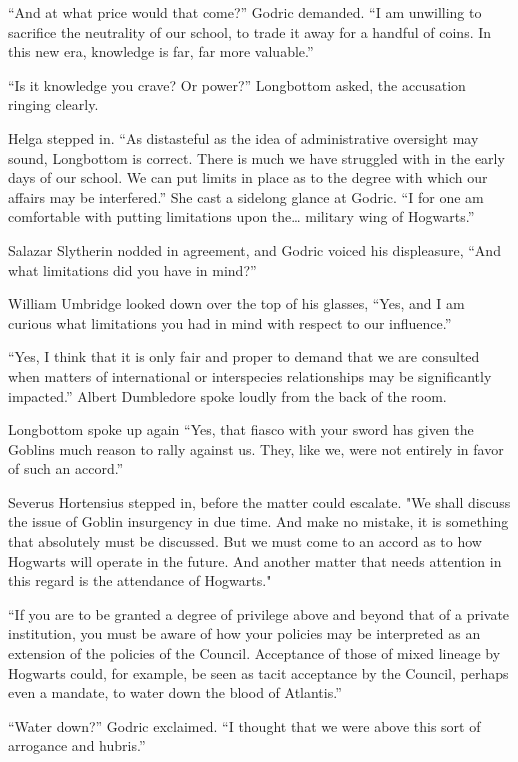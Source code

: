 “And at what price would that come?” Godric demanded. “I am unwilling to sacrifice the neutrality of our school, to trade it away for a handful of coins. In this new era, knowledge is far, far more valuable.”

“Is it knowledge you crave? Or power?” Longbottom asked, the accusation ringing clearly.

Helga stepped in. “As distasteful as the idea of administrative oversight may sound, Longbottom is correct. There is much we have struggled with in the early days of our school. We can put limits in place as to the degree with which our affairs may be interfered.” She cast a sidelong glance at Godric. “I for one am comfortable with putting limitations upon the… military wing of Hogwarts.”

Salazar Slytherin nodded in agreement, and Godric voiced his displeasure, “And what limitations did you have in mind?”

William Umbridge looked down over the top of his glasses, “Yes, and I am curious what limitations you had in mind with respect to our influence.”

“Yes, I think that it is only fair and proper to demand that we are consulted when matters of international or interspecies relationships may be significantly impacted.” Albert Dumbledore spoke loudly from the back of the room.

Longbottom spoke up again “Yes, that fiasco with your sword has given the Goblins much reason to rally against us. They, like we, were not entirely in favor of such an accord.”

Severus Hortensius stepped in, before the matter could escalate. "We shall discuss the issue of Goblin insurgency in due time. And make no mistake, it is something that absolutely must be discussed. But we must come to an accord as to how Hogwarts will operate in the future. And another matter that needs attention in this regard is the attendance of Hogwarts."

“If you are to be granted a degree of privilege above and beyond that of a private institution, you must be aware of how your policies may be interpreted as an extension of the policies of the Council. Acceptance of those of mixed lineage by Hogwarts could, for example, be seen as tacit acceptance by the Council, perhaps even a mandate, to water down the blood of Atlantis.”

“Water down?” Godric exclaimed. “I thought that we were above this sort of arrogance and hubris.”

